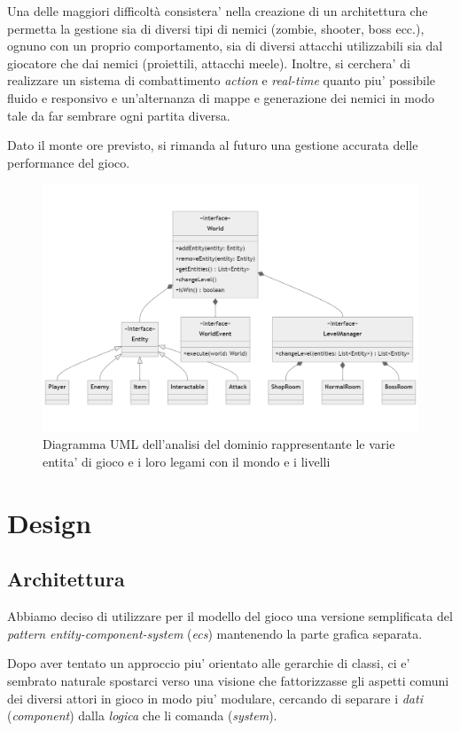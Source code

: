 \documentclass[a4paper,12pt]{report}
\begin{document}
Una delle maggiori difficoltà consistera' nella creazione di un architettura che permetta la gestione sia di diversi tipi di nemici (zombie, shooter, boss ecc.), ognuno con un proprio comportamento, sia di diversi attacchi utilizzabili sia dal giocatore che dai nemici (proiettili, attacchi meele). Inoltre, si cerchera' di realizzare un sistema di combattimento \textit{action} e \textit{real-time} quanto piu' possibile fluido e responsivo e un'alternanza di mappe e generazione dei nemici in modo tale da far sembrare ogni partita diversa.

Dato il monte ore previsto, si rimanda al futuro una gestione accurata delle performance del gioco.


\begin{figure}[h]
	\centering
	\includegraphics[width=\textwidth]{uml/uml_analisi.png}
	\caption{Diagramma UML dell'analisi del dominio rappresentante le varie entita' di gioco e i loro legami con il mondo e i livelli}
\end{figure}


\chapter{Design}


\section{Architettura}
Abbiamo deciso di utilizzare per il modello del gioco una versione semplificata del \textit{pattern entity-component-system} (\textit{ecs}) mantenendo la parte grafica separata.

Dopo aver tentato un approccio piu' orientato alle gerarchie di classi, ci e' sembrato naturale spostarci verso una visione che fattorizzasse gli aspetti comuni dei diversi attori in gioco in modo piu' modulare, cercando di separare i \textit{dati} (\textit{component}) dalla \textit{logica} che li comanda (\textit{system}).
\end{document}
